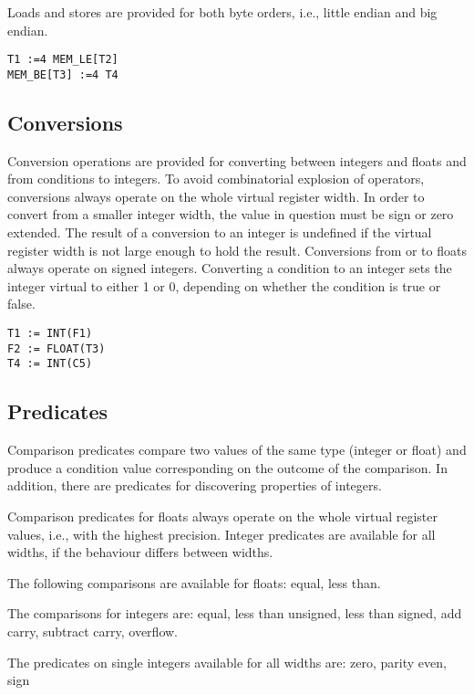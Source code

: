 \documentclass{article}
\begin{document}
Loads and stores are provided for both byte orders, i.e., little
endian and big endian.

\begin{verbatim}
T1 :=4 MEM_LE[T2]
MEM_BE[T3] :=4 T4
\end{verbatim}

\subsection{Conversions}

Conversion operations are provided for converting between integers and
floats and from conditions to integers.  To avoid combinatorial
explosion of operators, conversions always operate on the whole
virtual register width.  In order to convert from a smaller integer
width, the value in question must be sign or zero extended.  The
result of a conversion to an integer is undefined if the virtual
register width is not large enough to hold the result.  Conversions
from or to floats always operate on signed integers.  Converting a
condition to an integer sets the integer virtual to either 1 or 0,
depending on whether the condition is true or false.

\begin{verbatim}
T1 := INT(F1)
F2 := FLOAT(T3)
T4 := INT(C5)
\end{verbatim}

\subsection{Predicates}

Comparison predicates compare two values of the same type (integer or
float) and produce a condition value corresponding on the outcome of
the comparison.  In addition, there are predicates for discovering
properties of integers.

Comparison predicates for floats always operate on the whole virtual
register values, i.e., with the highest precision.  Integer predicates
are available for all widths, if the behaviour differs between widths.

The following comparisons are available for floats: equal, less than.

The comparisons for integers are: equal, less than unsigned, less than
signed, add carry, subtract carry, overflow.

The predicates on single integers available for all widths are: zero,
parity even, sign
\end{document}

